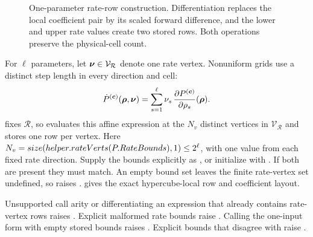 \begin{figure}[H]
\centering
{}
\caption{One-parameter rate-row construction. Differentiation replaces the local coefficient pair by its scaled forward difference, and the lower and upper rate values create two stored rows. Both operations preserve the physical-cell count.}
\label{fig:pdvar-rate-row-construction}
\end{figure}

For $\ell$ parameters, let $\boldsymbol{\nu}\in\mathcal V_{\mathcal R}$ denote one rate vertex. Nonuniform grids use a distinct step length in every direction and cell:
\begin{gather*}
    \dot P^{(\boldsymbol{c})}(\boldsymbol{\rho},\boldsymbol{\nu})=\sum_{s=1}^{\ell}\nu_s\,\frac{\partial P^{(\boldsymbol{c})}}{\partial\rho_s}(\boldsymbol{\rho}).
\end{gather*}
 fixes $\mathcal R$, so  evaluates this affine expression at the $N_v$ distinct vertices in $\mathcal V_{\mathcal R}$ and stores one row per vertex. Here $N_v=size(helper.rateVerts(P.RateBounds),1)\le 2^\ell$, with one value from each fixed rate direction. Supply the bounds explicitly as , or initialize  with . If both are present they must match. An empty bound set leaves the finite rate-vertex set undefined, so  raises .  gives the exact hypercube-local row and coefficient layout.

\remarkshead
Unsupported call arity or differentiating an expression that already contains rate-vertex rows raises . Explicit malformed rate bounds raise \allowbreak{}. Calling the one-input form with empty stored bounds raises \allowbreak{}. Explicit bounds that disagree with  raise \allowbreak{}.

